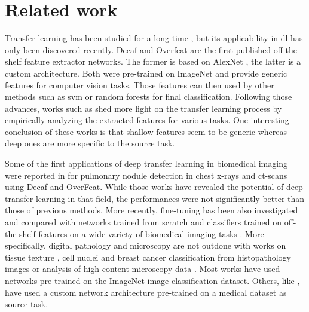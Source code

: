 \section{Related work}

Transfer learning has been studied for a long time \parencite{pan2010survey}, but its applicability in \acrshort{dl} has only been discovered recently. Decaf \parencite{donahue2014decaf} and Overfeat \parencite{razavian2014cnn,sermanet2013overfeat} are the first published off-the-shelf feature extractor networks. The former is based on AlexNet \parencite{krizhevsky2012imagenet}, the latter is a custom architecture. Both were pre-trained on ImageNet and provide generic features for computer vision tasks. Those features can then used by other methods such as \acrshort{svm} \parencite{fan2008liblinear} or random forests \parencite{breiman2001random} for final classification. Following those advances, works such as \parencite{yosinski2014transferable,zeiler2014visualizing} shed more light on the transfer learning process by empirically analyzing the extracted features for various tasks. One interesting conclusion of these works is that shallow features seem to be generic whereas deep ones are more specific to the source task.

Some of the first applications of deep transfer learning in biomedical imaging were reported in \parencite{bar2015chest,ciompi2015automatic,van2015off} for pulmonary nodule detection in chest x-rays and \acrshort{ct}-scans using Decaf and OverFeat. While those works have revealed the potential of deep transfer learning in that field, the performances were not significantly better than those of previous methods. More recently, fine-tuning has been also investigated and compared with networks trained from scratch and classifiers trained on off-the-shelf features on a wide variety of biomedical imaging tasks \parencite{antony2016quantifying,esteva2017dermatologist,gulshan2016development, ravishankar2016understanding,shin2016deep,tajbakhsh2016convolutional}. More specifically, digital pathology and microscopy are not outdone with works on tissue texture \parencite{kieffer2017convolutional}, cell nuclei \parencite{bayramoglu2016transfer} and breast cancer \parencite{han2017breast} classification from histopathology images or analysis of high-content microscopy data \parencite{kraus2017automated}. Most works have used networks pre-trained on the ImageNet image classification dataset. Others, like \parencite{kraus2017automated}, have used a custom network architecture pre-trained on a medical dataset as source task. 

